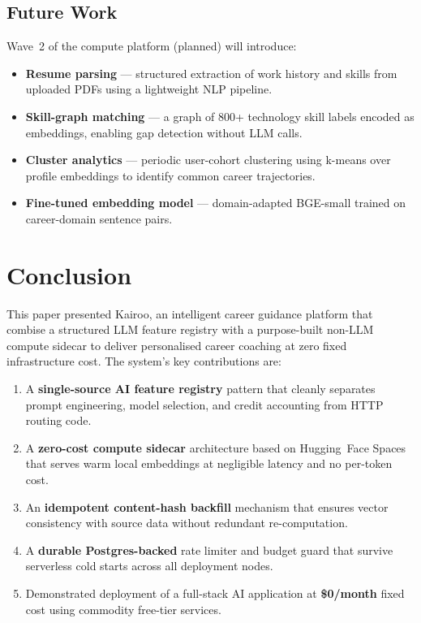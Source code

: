\documentclass[conference]{IEEEtran}
\begin{document}
\subsection{Future Work}

Wave~2 of the compute platform (planned) will introduce:

\begin{itemize}
  \item \textbf{Resume parsing} --- structured extraction of work history
        and skills from uploaded PDFs using a lightweight NLP pipeline.
  \item \textbf{Skill-graph matching} --- a graph of 800+ technology skill
        labels encoded as embeddings, enabling gap detection without LLM calls.
  \item \textbf{Cluster analytics} --- periodic user-cohort clustering using
        k-means over profile embeddings to identify common career trajectories.
  \item \textbf{Fine-tuned embedding model} --- domain-adapted BGE-small
        trained on career-domain sentence pairs.
\end{itemize}

\section{Conclusion}
\label{sec:conc}

This paper presented Kairoo, an intelligent career guidance platform that
combise a structured LLM feature registry with a purpose-built non-LLM
compute sidecar to deliver personalised career coaching at zero fixed
infrastructure cost. The system's key contributions are:

\begin{enumerate}
  \item A \textbf{single-source AI feature registry} pattern that cleanly
        separates prompt engineering, model selection, and credit accounting
        from HTTP routing code.
  \item A \textbf{zero-cost compute sidecar} architecture based on Hugging~Face
        Spaces that serves warm local embeddings at negligible latency and no
        per-token cost.
  \item An \textbf{idempotent content-hash backfill} mechanism that ensures
        vector consistency with source data without redundant re-computation.
  \item A \textbf{durable Postgres-backed} rate limiter and budget guard that
        survive serverless cold starts across all deployment nodes.
  \item Demonstrated deployment of a full-stack AI application at
        \textbf{\$0/month} fixed cost using commodity free-tier services.
\end{enumerate}
\end{document}
